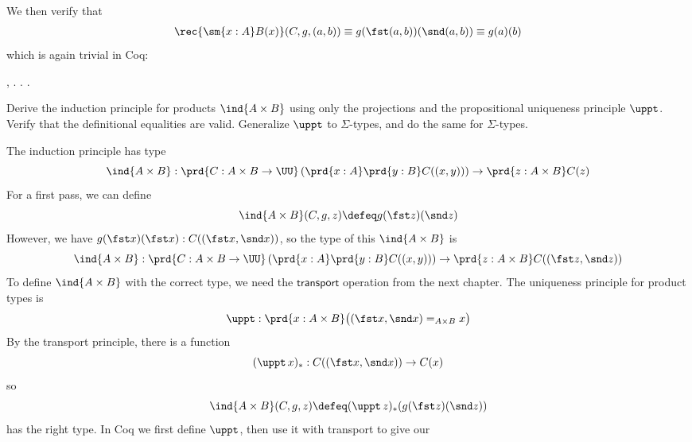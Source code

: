 \noindent
We then verify that
\begin{align*}
\rec{\sm{x:A}B(x)}(C, g, (a, b))
\equiv g(\fst (a, b))(\snd (a, b))
\equiv g(a)(b)
\end{align*}
which is again trivial in Coq: \begin{coqdoccode}
\coqdocemptyline
\coqdocnoindent
{} \coqdockw{\ensuremath{\forall}}    ,    \coqdocnotation{(}\coqdocnotation{;} \coqdocnotation{)} \coqdocnotation{=}   . . .\coqdoceol
\coqdocemptyline
\coqdocemptyline
\end{coqdoccode}
Derive the induction principle for products $\ind{A \times B}$ using only the
projections and the propositional uniqueness principle $\uppt$.  Verify that
the definitional equalities are valid.  Generalize $\uppt$ to $\Sigma$-types,
and do the same for $\Sigma$-types. \begin{coqdoccode}
\coqdocemptyline
\end{coqdoccode}
\soln 
The induction principle has type
\[
\ind{A\times B} : \prd{C: A\times B \to \UU}\left(\prd{x:A}\prd{y:B}C((x,
y))\right) \to \prd{z:A\times B}C(z)
\]
For a first pass, we can define
\[
\ind{A\times B}(C, g, z)
\defeq
g(\fst z)(\snd z)
\]
However, we have $g(\fst x)(\fst x) : C((\fst x, \snd x))$, so the type of this
$\ind{A \times B}$ is
\[
\ind{A\times B} : \prd{C: A\times B \to \UU}\left(\prd{x:A}\prd{y:B}C((x,
y))\right) \to \prd{z:A\times B}C((\fst z, \snd z))
\]
To define $\ind{A \times B}$ with the correct type, we need the
$\mathsf{transport}$ operation from the next chapter.  The uniqueness principle
for product types is
\[
\uppt : \prd{x : A \times B} \big((\fst x, \snd x) =_{A \times B} x\big)
\]
By the transport principle, there is a function
\[
(\uppt\, x)_{*} : C((\fst x, \snd x)) \to C(x)
\]
so
\[
\ind{A \times B}(C, g, z)
\defeq
(\uppt\, z)_{*}(g(\fst z)(\snd z))
\]
has the right type.
In Coq we first define $\uppt$, then use it with transport to give our
